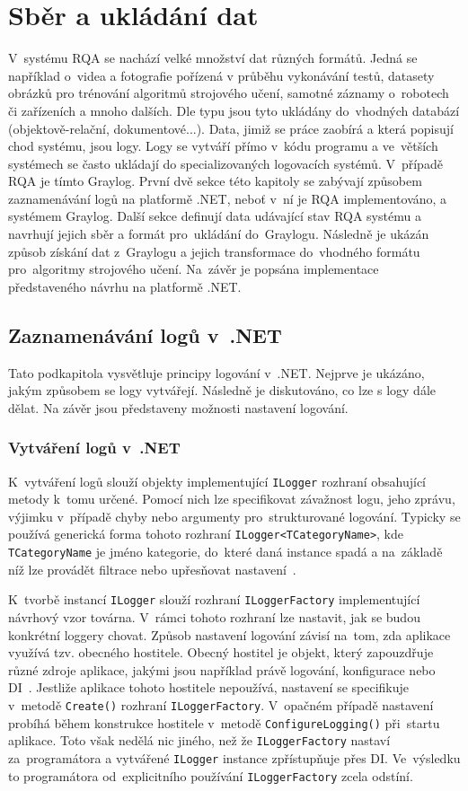 \chapter{Sběr a ukládání dat}
\label{sber-dat}
V~systému RQA se nachází velké množství dat různých formátů. Jedná se například o~videa a fotografie pořízená v průběhu vykonávání testů, datasety obrázků pro trénování algoritmů strojového učení, samotné záznamy o~robotech či zařízeních a mnoho dalších. Dle typu jsou tyto ukládány do~vhodných databází (objektově-relační, dokumentové...). Data, jimiž se práce zaobírá a která popisují chod systému, jsou logy. Logy se vytváří přímo v~kódu programu a ve~větších systémech se často ukládají do specializovaných logovacích systémů. V~případě RQA je tímto Graylog. První dvě sekce této kapitoly se zabývají způsobem zaznamenávání logů na platformě .NET, neboť v~ní je RQA implementováno, a systémem Graylog. Další sekce definují data udávající stav RQA systému a navrhují jejich sběr a formát pro~ukládání do~Graylogu. Následně je ukázán způsob získání dat z~Graylogu a jejich transformace do~vhodného formátu pro~algoritmy strojového učení. Na~závěr je popsána implementace představeného návrhu na platformě .NET.

\section{Zaznamenávání logů v~.NET}
Tato podkapitola vysvětluje principy logování v~.NET. Nejprve je ukázáno, jakým způsobem se logy vytvářejí. Následně je diskutováno, co lze s logy dále dělat. Na závěr jsou představeny možnosti nastavení logování.

\subsection{Vytváření logů v~.NET}
K~vytváření logů slouží objekty implementující \texttt{ILogger} rozhraní obsahující metody k~tomu určené. Pomocí nich lze specifikovat závažnost logu, jeho zprávu, výjimku v~případě chyby nebo argumenty pro~strukturované logování. Typicky se používá generická forma tohoto rozhraní \texttt{ILogger<TCategoryName>}, kde \texttt{TCategoryName} je jméno kategorie, do~které daná instance spadá a na~základě níž lze provádět filtrace nebo upřesňovat nastavení~\cite{logging}.

K~tvorbě instancí \texttt{ILogger} slouží rozhraní \texttt{ILoggerFactory} implementující návrhový vzor továrna. V~rámci tohoto rozhraní lze nastavit, jak se budou konkrétní loggery chovat. Způsob nastavení logování závisí na~tom, zda aplikace využívá tzv. obecného hostitele. Obecný hostitel je objekt, který zapouzdřuje různé zdroje aplikace, jakými jsou například právě logování, konfigurace nebo DI~\cite{generic-host}. Jestliže aplikace tohoto hostitele nepoužívá, nastavení se specifikuje v~metodě \texttt{Create()} rozhraní \texttt{ILoggerFactory}. V~opačném případě nastavení probíhá během konstrukce hostitele v~metodě \texttt{ConfigureLogging()} při~startu aplikace. Toto však nedělá nic jiného, než že \texttt{ILoggerFactory} nastaví za~programátora a vytvářené \texttt{ILogger} instance zpřístupňuje přes DI. Ve~výsledku to programátora od~explicitního používání \texttt{ILoggerFactory} zcela odstíní.

